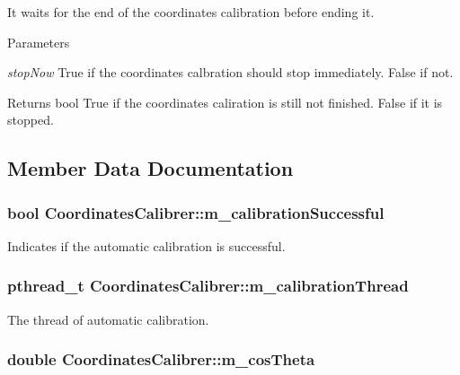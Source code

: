 It waits for the end of the coordinates calibration before ending it. 


\begin{DoxyParams}{Parameters}
\item[{\em stopNow}]True if the coordinates calbration should stop immediately. False if not. \end{DoxyParams}
\begin{DoxyReturn}{Returns}
bool True if the coordinates caliration is still not finished. False if it is stopped. 
\end{DoxyReturn}


\subsection{Member Data Documentation}
\hypertarget{classCoordinatesCalibrer_aade3d6c933ebb71c197061828ca6b951}{
\subsubsection[{m\_\-calibrationSuccessful}]{\setlength{\rightskip}{0pt plus 5cm}bool {\bf CoordinatesCalibrer::m\_\-calibrationSuccessful}}}
\label{classCoordinatesCalibrer_aade3d6c933ebb71c197061828ca6b951}
Indicates if the automatic calibration is successful. \hypertarget{classCoordinatesCalibrer_aa2b792c4284dc94338c9acbd26ea2c3a}{
\subsubsection[{m\_\-calibrationThread}]{\setlength{\rightskip}{0pt plus 5cm}pthread\_\-t {\bf CoordinatesCalibrer::m\_\-calibrationThread}}}
\label{classCoordinatesCalibrer_aa2b792c4284dc94338c9acbd26ea2c3a}
The thread of automatic calibration. \hypertarget{classCoordinatesCalibrer_a0fd71c87e90fc61802942e22c9584fb9}{
\subsubsection[{m\_\-cosTheta}]{\setlength{\rightskip}{0pt plus 5cm}double {\bf CoordinatesCalibrer::m\_\-cosTheta}}}
